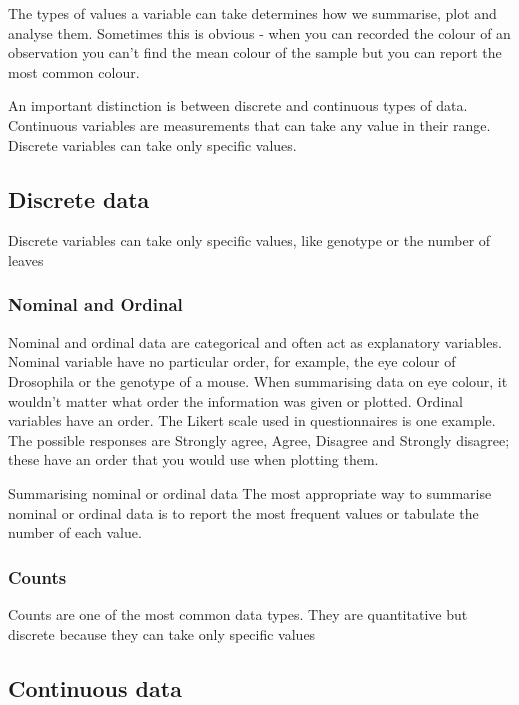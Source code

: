 \documentclass[
  letterpaper,
  DIV=11,
  numbers=noendperiod]{scrreprt}
\begin{document}
The types of values a variable can take determines how we summarise,
plot and analyse them. Sometimes this is obvious - when you can recorded
the colour of an observation you can't find the mean colour of the
sample but you can report the most common colour.

An important distinction is between discrete and continuous types of
data. Continuous variables are measurements that can take any value in
their range. Discrete variables can take only specific values.

\hypertarget{discrete-data}{%
\subsection{Discrete data}\label{discrete-data}}

Discrete variables can take only specific values, like genotype or the
number of leaves

\hypertarget{nominal-and-ordinal}{%
\subsubsection{Nominal and Ordinal}\label{nominal-and-ordinal}}

Nominal and ordinal data are categorical and often act as explanatory
variables.\\
Nominal variable have no particular order, for example, the eye colour
of Drosophila or the genotype of a mouse. When summarising data on eye
colour, it wouldn't matter what order the information was given or
plotted. Ordinal variables have an order. The Likert scale used in
questionnaires is one example. The possible responses are Strongly
agree, Agree, Disagree and Strongly disagree; these have an order that
you would use when plotting them.

Summarising nominal or ordinal data The most appropriate way to
summarise nominal or ordinal data is to report the most frequent values
or tabulate the number of each value.

\hypertarget{counts}{%
\subsubsection{Counts}\label{counts}}

Counts are one of the most common data types. They are quantitative but
discrete because they can take only specific values

\hypertarget{continuous-data}{%
\subsection{Continuous data}\label{continuous-data}}
\end{document}
